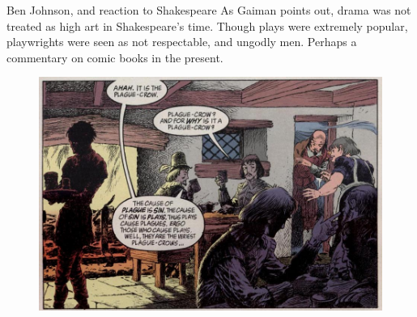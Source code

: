 \documentclass{beamer}
\begin{document}
\begin{frame}{Ben Johnson, and reaction to Shakespeare}
      As Gaiman points out, drama was not treated as high art in Shakespeare's time. Though plays were extremely popular, playwrights were seen as not respectable, and ungodly men. Perhaps a commentary on comic books in the present.

      \begin{figure}[htp]
        \begin{center}
          \centering
          \includegraphics[scale=0.3]{../Presentation/plague.jpg}
        \end{center}
      \end{figure}
      
  \end{frame}
\end{document}
